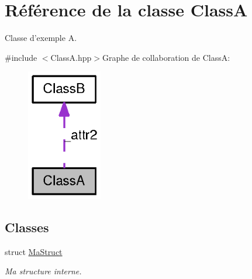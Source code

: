 \hypertarget{class_class_a}{
\section{Référence de la classe ClassA}
\label{class_class_a}
}


Classe d'exemple A.  


{\ttfamily \#include $<$ClassA.hpp$>$}Graphe de collaboration de ClassA:\nopagebreak
\begin{figure}[H]
\begin{center}
\leavevmode
\includegraphics[width=93pt]{class_class_a__coll__graph}
\end{center}
\end{figure}
\subsection*{Classes}
\begin{DoxyCompactItemize}
\item 
struct \hyperlink{struct_class_a_1_1_ma_struct}{MaStruct}
\begin{DoxyCompactList}\small\item\em Ma structure interne. \item\end{DoxyCompactList}\end{DoxyCompactItemize}
